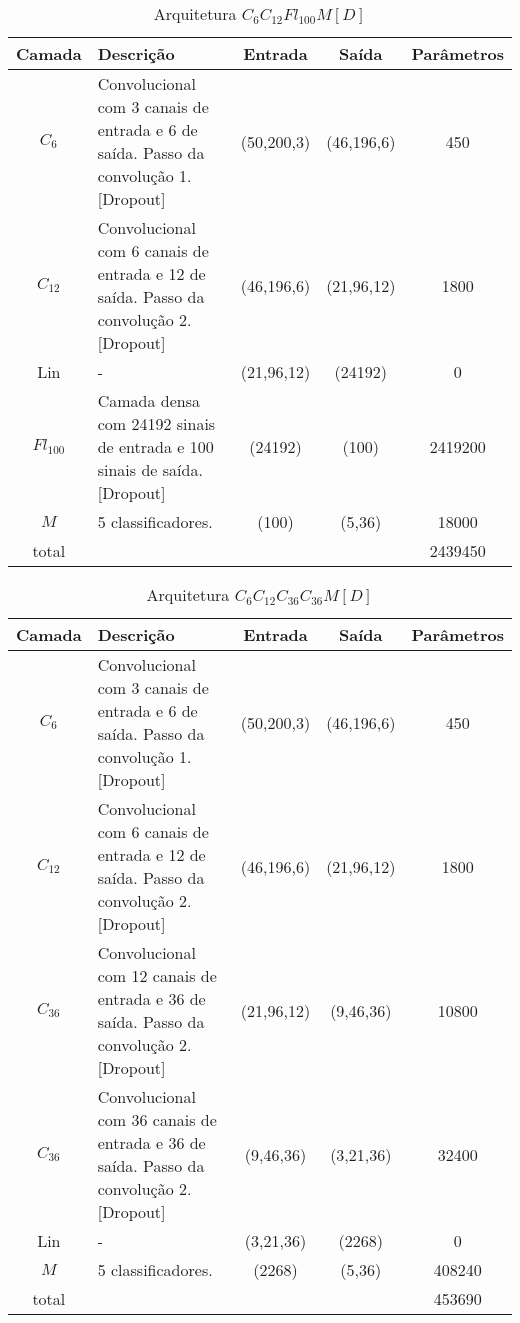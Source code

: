 \noindent
\begin{table}[!p]
	\begin{center}
		\caption{Arquitetura $C_6C_{12}Fl_{100}M[D]$}
	\end{center}
\begin{tabularx}{\linewidth}{ |c|X|c|c|c| }
	\hline
	Camada & Descrição & Entrada & Saída & Parâmetros \\ \hline \hline
	$C_{6}$ & Convolucional com 3 canais de entrada e 6 de saída. Passo da convolução 1.  [Dropout] & (50,200,3) & (46,196,6) & 450 \\ \hline
	$C_{12}$ & Convolucional com 6 canais de entrada e 12 de saída. Passo da convolução 2.  [Dropout] & (46,196,6) & (21,96,12) & 1800 \\ \hline
	Lin & - & (21,96,12) & (24192) & 0 \\ \hline
	$Fl_{100}$ & Camada densa com 24192 sinais de entrada e 100 sinais de saída.  [Dropout] & (24192) & (100) & 2419200 \\ \hline
	$M$ & 5 classificadores. & (100) & (5,36) & 18000 \\ \hline
	total &  &  &  & 2439450 \\ \hline
\end{tabularx}
\end{table}
\noindent
\begin{table}[!p]
	\begin{center}
		\caption{Arquitetura $C_6C_{12}C_{36}C_{36}M[D]$}
	\end{center}
\begin{tabularx}{\linewidth}{ |c|X|c|c|c| }
	\hline
	Camada & Descrição & Entrada & Saída & Parâmetros \\ \hline \hline
	$C_{6}$ & Convolucional com 3 canais de entrada e 6 de saída. Passo da convolução 1.  [Dropout] & (50,200,3) & (46,196,6) & 450 \\ \hline
	$C_{12}$ & Convolucional com 6 canais de entrada e 12 de saída. Passo da convolução 2.  [Dropout] & (46,196,6) & (21,96,12) & 1800 \\ \hline
	$C_{36}$ & Convolucional com 12 canais de entrada e 36 de saída. Passo da convolução 2.  [Dropout] & (21,96,12) & (9,46,36) & 10800 \\ \hline
	$C_{36}$ & Convolucional com 36 canais de entrada e 36 de saída. Passo da convolução 2.  [Dropout] & (9,46,36) & (3,21,36) & 32400 \\ \hline
	Lin & - & (3,21,36) & (2268) & 0 \\ \hline
	$M$ & 5 classificadores. & (2268) & (5,36) & 408240 \\ \hline
	total &  &  &  & 453690 \\ \hline
\end{tabularx}
\end{table}

